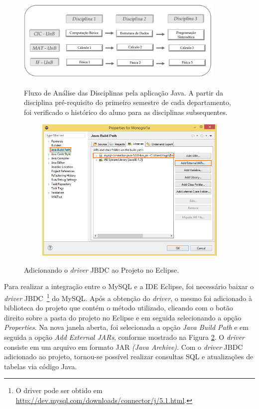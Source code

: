 	
	
	\begin{figure}[!htb]
		\centering
		{\includegraphics[width=10cm, height=4cm]{images/analiseJava}}
		\caption {Fluxo de Análise das Disciplinas pela aplicação Java. A partir da disciplina pré-requisito do primeiro semestre de cada departamento, foi verificado o histórico do aluno para as disciplinas subsequentes.}
		\label{metodoJava}
	\end{figure}
	
		\begin{figure}[!htb]
			\centering
			{\includegraphics[width=12cm, height=7cm]{images/driverEclipse}}
			\caption {Adicionando o \textit{driver} JBDC ao Projeto no Eclipse.}
			\label{driverJBDC}
		\end{figure}
	
	Para realizar a integração entre o MySQL e a IDE Eclipse, foi necessário baixar o \textit{driver} JBDC~\footnote{O driver pode ser obtido em \url{http://dev.mysql.com/downloads/connector/j/5.1.html}.} do MySQL. Após a obtenção do \textit{driver}, o mesmo foi adicionado à biblioteca do projeto que contém o método utilizado, clicando com o botão direito sobre a pasta do projeto no Eclipse e em seguida selecionando a opção \textit{Properties}. Na nova janela aberta, foi selecionada a opção \textit{Java Build Path} e em seguida a opção \textit{Add External JARs}, conforme mostrado na Figura \ref{driverJBDC}. O \textit{driver} consiste em um arquivo em formato JAR \textit{(Java Archive)}. Com o \textit{driver} JBDC adicionado ao projeto, tornou-se possível realizar consultas SQL e atualizações de tabelas via código Java. 
	

